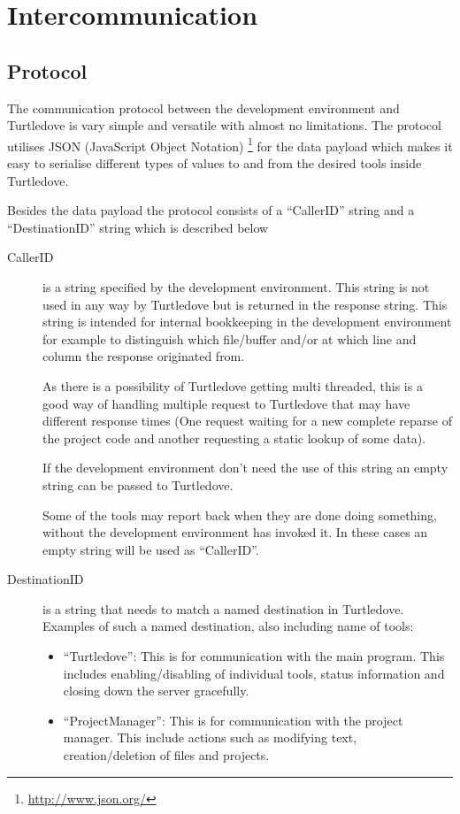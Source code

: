 \documentclass[a4paper, oneside, final]{memoir}
\theoremstyle{definition}
\begin{document}
\chapter*{Intercommunication}


\section*{Protocol}


The communication protocol between the development environment and Turtledove is
vary simple and versatile with almost no limitations. The protocol utilises JSON
(JavaScript Object Notation) \footnote{\url{http://www.json.org/}} for the data
payload which makes it easy to serialise different types of values to and from
the desired tools inside Turtledove.

Besides the data payload the protocol consists of a ``CallerID'' string and a
``DestinationID'' string which is described below

\begin{description}
\item[CallerID] is a string specified by the development environment. This
  string is not used in any way by Turtledove but is returned in the response
  string. This string is intended for internal bookkeeping in the development
  environment for example to distinguish which file/buffer and/or at which line
  and column the response originated from.

  As there is a possibility of Turtledove getting multi threaded, this is a good
  way of handling multiple request to Turtledove that may have different
  response times (One request waiting for a new complete reparse of the project code
  and another requesting a static lookup of some data).

  If the development environment don't need the use of this string an empty
  string can be passed to Turtledove.

  Some of the tools may report back when they are done doing something, without
  the development environment has invoked it. In these cases an empty string
  will be used as ``CallerID''.

\item[DestinationID] is a string that needs to match a named destination in
  Turtledove. Examples of such a named destination, also including name of
  tools:

  \begin{itemize}
  \item ``Turtledove'': This is for communication with the main program. This
    includes enabling/disabling of individual tools, status information and
    closing down the server gracefully.

  \item ``ProjectManager'': This is for communication with the project
    manager. This include actions such as modifying text, creation/deletion of
    files and projects.
  \end{itemize}
\end{description}
\end{document}
